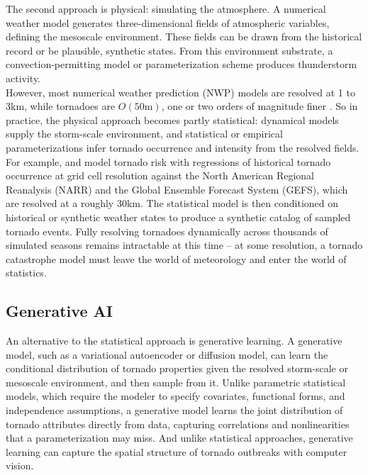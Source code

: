\documentclass{article}
\begin{document}
The second approach is physical: simulating the atmosphere. A numerical weather model generates three-dimensional fields of atmospheric variables, defining the mesoscale environment. These fields can be drawn from the historical record or be plausible, synthetic states. From this environment substrate, a convection-permitting model or parameterization scheme produces thunderstorm activity.   \\

However, most numerical weather prediction (NWP) models are resolved at 1 to 3km, while tornadoes are $O(50\text{m})$, one or two orders of magnitude finer \cite{schenkman2014tornadogenesis}. So in practice, the physical approach  becomes partly statistical: dynamical models supply the storm-scale environment, and statistical or empirical parameterizations infer tornado occurrence and intensity from the resolved fields. For example, \cite{malloy2024stochastic} and \cite{malloy2026global} model tornado risk with regressions of historical tornado occurrence at grid cell resolution against the North American Regional Reanalysis (NARR) and the Global Ensemble Forecast System (GEFS), which are resolved at a roughly 30km. The statistical model is then conditioned on historical or synthetic weather states to produce a synthetic catalog of sampled tornado events. Fully resolving tornadoes dynamically across thousands of simulated seasons remains intractable at this time -- at some resolution, a tornado catastrophe model must leave the world of meteorology and enter the world of statistics.

\subsection*{Generative AI}

An alternative to the statistical approach is generative learning. A generative model, such as a variational autoencoder or diffusion model, can learn the conditional distribution of tornado properties given the resolved storm-scale or mesoscale environment, and then sample from it. Unlike parametric statistical models, which require the modeler to specify covariates, functional forms, and independence assumptions, a generative model learns the joint distribution of tornado attributes directly from data, capturing correlations and nonlinearities that a parameterization may miss. And unlike  statistical approaches, generative learning can capture the spatial structure of tornado outbreaks with computer vision. \\
\end{document}
